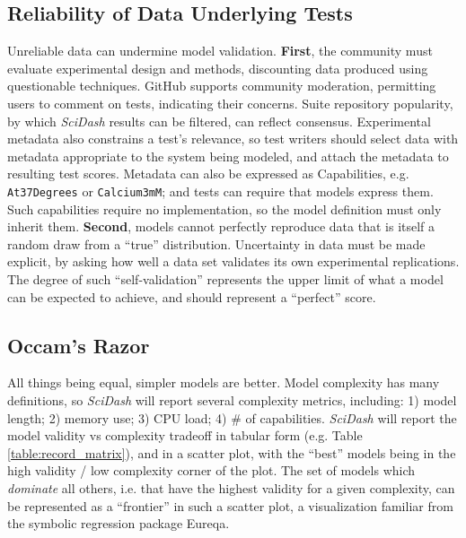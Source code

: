 \documentclass[11pt,letterpaper]{article}
\let\verbx\lstinline
\begin{document}
\subsection{Reliability of Data Underlying Tests}
Unreliable data can undermine model validation. 
\textbf{First}, the community must evaluate experimental design and methods, discounting data produced using questionable techniques. 
GitHub supports community moderation, permitting users to comment on tests, indicating their concerns. 
Suite repository popularity, by which \textit{SciDash} results can be filtered, can reflect consensus. 
Experimental metadata also constrains a test's relevance, so test writers should select data with metadata appropriate to the system being modeled, and attach the metadata to resulting test scores. 
Metadata can also be expressed as Capabilities, e.g. \verbx{At37Degrees} or \verbx{Calcium3mM}; and tests can require that models express them. 
Such capabilities require no implementation, so the model definition must only inherit them. 
\textbf{Second}, models cannot perfectly reproduce data that is itself a random draw from a ``true'' distribution. 
Uncertainty in data must be made explicit, by asking how well a data set validates its own experimental replications\cite{kriegeskorte_representational_2008}. 
The degree of such ``self-validation'' represents the upper limit of what a model can be expected to achieve, and should represent a ``perfect'' score.  

\subsection{Occam's Razor}
All things being equal, simpler models are better. 
Model complexity has many definitions, so \textit{SciDash} will report several complexity metrics\cite{mccabe_complexity_1976}, including: 
1) model length; 2) memory use; 3) CPU load; 4) \# of capabilities. 
\textit{SciDash} will report the model validity vs complexity tradeoff in tabular form (e.g. Table \ref{table:record_matrix}), and in a scatter plot, with the ``best'' models being in the high validity / low complexity corner of the plot. 
The set of models which \textit{dominate} all others, i.e. that have the highest validity for a given complexity, can be represented as a ``frontier'' in such a scatter plot, a visualization familiar from the symbolic regression package Eureqa\cite{schmidt_distilling_2009}.  
\end{document}
